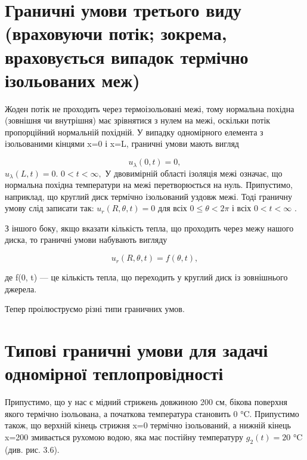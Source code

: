 \section{Граничні умови третього виду (враховуючи потік; зокрема, враховується випадок термічно ізольованих меж)}\label{ux433ux440ux430ux43dux438ux447ux43dux456-ux443ux43cux43eux432ux438-ux442ux440ux435ux442ux44cux43eux433ux43e-ux432ux438ux434ux443-ux432ux440ux430ux445ux43eux432ux443ux44eux447ux438-ux43fux43eux442ux456ux43a-ux437ux43eux43aux440ux435ux43cux430-ux432ux440ux430ux445ux43eux432ux443ux454ux442ux44cux441ux44f-ux432ux438ux43fux430ux434ux43eux43a-ux442ux435ux440ux43cux456ux447ux43dux43e-ux456ux437ux43eux43bux44cux43eux432ux430ux43dux438ux445-ux43cux435ux436}

Жоден потік не проходить через термоізольовані межі, тому нормальна похідна (зовнішня чи внутрішня) має зрівнятися з нулем на межі, оскільки потік пропорційний нормальній похідній. У випадку одномірного елемента з ізольованими кінцями x=0 і x=L, граничні умови мають вигляд

\[u_{\lambda}(0, t) = 0,\] \(u_{\lambda}(L, t) = 0.\) \(0 < t < \infty,\) У двовимірній області ізоляція межі означає, що нормальна похідна температури на межі перетворюється на нуль. Припустимо, наприклад, що круглий диск термічно ізольований уздовж межі. Тоді граничну умову слід записати так: \(u_r(R, \theta, t) = 0\) для всіх \(0 \le \theta < 2\pi\) і всіх \(0 < t < \infty\) .

З іншого боку, якщо вказати кількість тепла, що проходить через межу нашого диска, то граничні умови набувають вигляду

\[u_r(R, \theta, t) = f(\theta, t),\]

де f(0, t) --- це кількість тепла, що переходить у круглий диск із зовнішнього джерела.

Тепер проілюструємо різні типи граничних умов.

\section{Типові граничні умови для задачі одномірної теплопровідності}\label{ux442ux438ux43fux43eux432ux456-ux433ux440ux430ux43dux438ux447ux43dux456-ux443ux43cux43eux432ux438-ux434ux43bux44f-ux437ux430ux434ux430ux447ux456-ux43eux434ux43dux43eux43cux456ux440ux43dux43eux457-ux442ux435ux43fux43bux43eux43fux440ux43eux432ux456ux434ux43dux43eux441ux442ux456}

Припустимо, що у нас є мідний стрижень довжиною 200 см, бікова поверхня якого термічно ізольована, а початкова температура становить 0 °C. Припустимо також, що верхній кінець стрижня x=0 термічно ізольований, а нижній кінець x=200 змивається рухомою водою, яка має постійну температуру \(g_2(t)=20\) °C (див. рис. 3.6).

